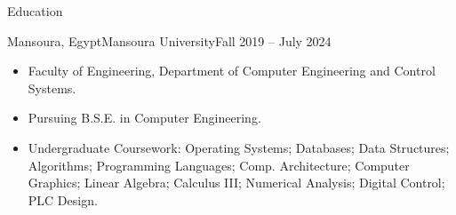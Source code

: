 \documentclass[]{cv}
\begin{document}
	\begin{cvsection}{Education}
	
	\vspace{2mm}

		\begin{cvsubsection}{Mansoura, Egypt}{Mansoura University}{Fall 2019 -- July 2024}
			\begin{itemize}
				\item Faculty of Engineering, Department of Computer Engineering and Control Systems.
				\item Pursuing B.S.E. in Computer Engineering.
				
				\item Undergraduate Coursework: Operating Systems; Databases; Data Structures; Algorithms; Programming Languages; Comp. Architecture; Computer Graphics; Linear Algebra; Calculus III; Numerical Analysis; Digital Control; PLC Design.
			\end{itemize}
		\end{cvsubsection}
	\end{cvsection}
	
\end{document}
